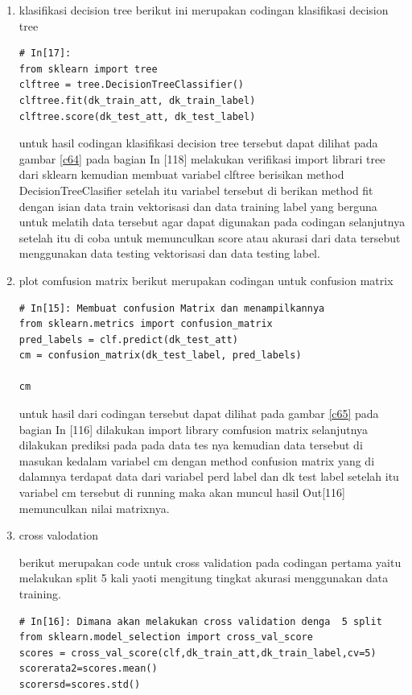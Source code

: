 \begin{enumerate}
\item klasifikasi decision tree 
berikut ini merupakan codingan klasifikasi decision tree
\begin{verbatim}
# In[17]:
from sklearn import tree
clftree = tree.DecisionTreeClassifier()
clftree.fit(dk_train_att, dk_train_label)
clftree.score(dk_test_att, dk_test_label)
\end{verbatim}
untuk hasil codingan klasifikasi decision tree tersebut dapat dilihat pada gambar \ref{c64} pada bagian In [118] melakukan verifikasi import librari tree dari sklearn kemudian membuat variabel clftree berisikan method DecisionTreeClasifier setelah itu variabel tersebut di berikan method fit dengan isian data train vektorisasi dan data training label yang berguna untuk melatih data tersebut agar dapat digunakan pada codingan selanjutnya setelah itu di coba untuk memunculkan score atau akurasi dari data tersebut menggunakan data testing vektorisasi dan data testing label.
\item plot comfusion matrix
berikut merupakan codingan untuk confusion matrix 
\begin{verbatim}
# In[15]: Membuat confusion Matrix dan menampilkannya
from sklearn.metrics import confusion_matrix
pred_labels = clf.predict(dk_test_att)
cm = confusion_matrix(dk_test_label, pred_labels)

cm
\end{verbatim}
untuk hasil dari codingan tersebut dapat dilihat pada gambar \ref{c65} pada bagian In [116] dilakukan import library comfusion matrix selanjutnya dilakukan prediksi pada pada data tes nya kemudian data tersebut di masukan kedalam variabel cm dengan method confusion matrix yang di dalamnya terdapat data dari variabel perd label dan dk test label setelah itu variabel cm tersebut di running maka akan muncul hasil Out[116] memunculkan nilai matrixnya. 
\item cross valodation 

berikut merupakan code untuk cross validation pada codingan pertama yaitu melakukan split 5 kali yaoti mengitung tingkat akurasi menggunakan data training.
\begin{verbatim}
# In[16]: Dimana akan melakukan cross validation denga  5 split
from sklearn.model_selection import cross_val_score
scores = cross_val_score(clf,dk_train_att,dk_train_label,cv=5)
scorerata2=scores.mean()
scorersd=scores.std()


\end{verbatim}
\end{enumerate}
